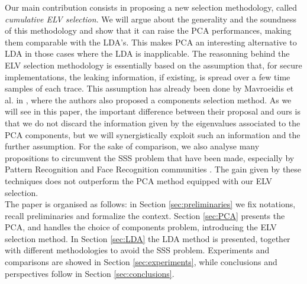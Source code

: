  Our main contribution consists in proposing a new selection methodology, called {\em cumulative ELV selection}. We will argue about the generality and the soundness of this methodology and show that it can raise the PCA performances, making them comparable with the LDA's. This makes PCA an interesting alternative to LDA in those cases where the LDA is inapplicable. The reasonning behind the ELV selection methodology is essentially based on the assumption that, for secure implementations, the leaking information, if existing, is spread over a few time samples of each trace. This assumption has already been done by Mavroeidis et al. in \cite{SCAclassProbl}, where the authors  also proposed a components selection method. As we will see in this paper, the important difference between their proposal and ours is that we do not discard the information given by the eigenvalues associated to the PCA components, but we will synergistically exploit such an information and the further assumption. For the sake of comparison, we also analyse many propositions to circumvent the SSS problem that have been made, especially by Pattern Recognition and Face Recognition communities \cite{eigenfaces,Chen2000,huang,Yu01adirect}. The gain given by these techniques does not outperform the PCA method equipped with our ELV selection.\\

The paper is organised as follows: in Section \ref{sec:preliminaries} we fix notations, recall preliminaries and formalize the context. Section \ref{sec:PCA} presents the PCA, and handles the choice of components problem, introducing the  ELV selection method. In Section \ref{sec:LDA} the LDA method is presented, together with different methodologies to avoid the SSS problem. Experiments and comparisons are showed in Section \ref{sec:experiments}, while conclusions and perspectives follow in Section \ref{sec:conclusions}. 